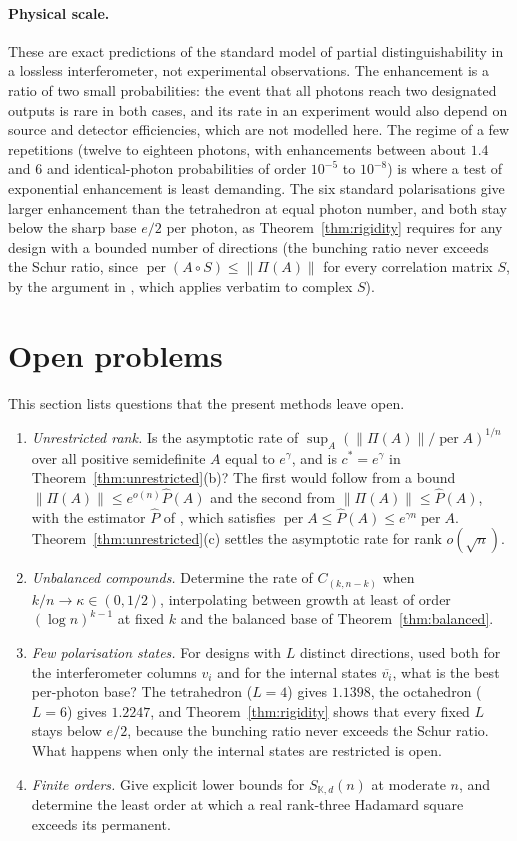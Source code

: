 \documentclass[11pt,a4paper]{article}
\theoremstyle{remark}
\newcommand{\per}{\operatorname{per}}
\newcommand{\norm}[1]{\left\lVert#1\right\rVert}
\newcommand{\K}{\mathbb K}
\begin{document}
\paragraph{Physical scale.}
These are exact predictions of the standard model of partial distinguishability in a lossless interferometer, not experimental observations. The enhancement is a ratio of two small probabilities: the event that all photons reach two designated outputs is rare in both cases, and its rate in an experiment would also depend on source and detector efficiencies, which are not modelled here. The regime of a few repetitions (twelve to eighteen photons, with enhancements between about $1.4$ and $6$ and identical-photon probabilities of order $10^{-5}$ to $10^{-8}$) is where a test of exponential enhancement is least demanding. The six standard polarisations give larger enhancement than the tetrahedron at equal photon number, and both stay below the sharp base $e/2$ per photon, as Theorem~\ref{thm:rigidity} requires for any design with a bounded number of directions (the bunching ratio never exceeds the Schur ratio, since $\per(A\circ S)\le\norm{\Pi(A)}$ for every correlation matrix $S$, by the argument in \cite[Section~1]{Drury17}, which applies verbatim to complex $S$).

\section{Open problems}\label{sec:open}
This section lists questions that the present methods leave open.
\begin{enumerate}
\item \emph{Unrestricted rank.} Is the asymptotic rate of $\sup_A(\norm{\Pi(A)}/\per A)^{1/n}$ over all positive semidefinite $A$ equal to $e^\gamma$, and is $c^*=e^\gamma$ in Theorem~\ref{thm:unrestricted}(b)? The first would follow from a bound $\norm{\Pi(A)}\le e^{o(n)}\widehat P(A)$ and the second from $\norm{\Pi(A)}\le\widehat P(A)$, with the estimator $\widehat P$ of \cite{AE26}, which satisfies $\per A\le\widehat P(A)\le e^{\gamma n}\per A$. Theorem~\ref{thm:unrestricted}(c) settles the asymptotic rate for rank $o(\sqrt n)$.
\item \emph{Unbalanced compounds.} Determine the rate of $C_{(k,n-k)}$ when $k/n\to\kappa\in(0,1/2)$, interpolating between growth at least of order $(\log n)^{k-1}$ at fixed $k$ \cite{EPBS} and the balanced base of Theorem~\ref{thm:balanced}.
\item \emph{Few polarisation states.} For designs with $L$ distinct directions, used both for the interferometer columns $v_i$ and for the internal states $\overline{v_i}$, what is the best per-photon base? The tetrahedron ($L=4$) gives $1.1398$, the octahedron ($L=6$) gives $1.2247$, and Theorem~\ref{thm:rigidity} shows that every fixed $L$ stays below $e/2$, because the bunching ratio never exceeds the Schur ratio. What happens when only the internal states are restricted is open.
\item \emph{Finite orders.} Give explicit lower bounds for $S_{\K,d}(n)$ at moderate $n$, and determine the least order at which a real rank-three Hadamard square exceeds its permanent.
\end{enumerate}
\end{document}
